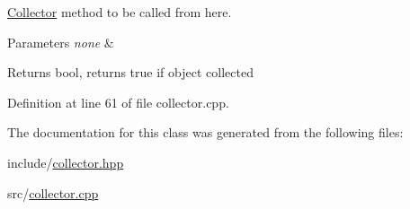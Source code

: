 \hyperlink{class_collector}{Collector} method to be called from here. 


\begin{DoxyParams}{Parameters}
{\em none} & \\
\hline
\end{DoxyParams}
\begin{DoxyReturn}{Returns}
bool, returns true if object collected 
\end{DoxyReturn}


Definition at line 61 of file collector.\+cpp.



The documentation for this class was generated from the following files\+:\begin{DoxyCompactItemize}
\item 
include/\hyperlink{collector_8hpp}{collector.\+hpp}\item 
src/\hyperlink{collector_8cpp}{collector.\+cpp}\end{DoxyCompactItemize}
